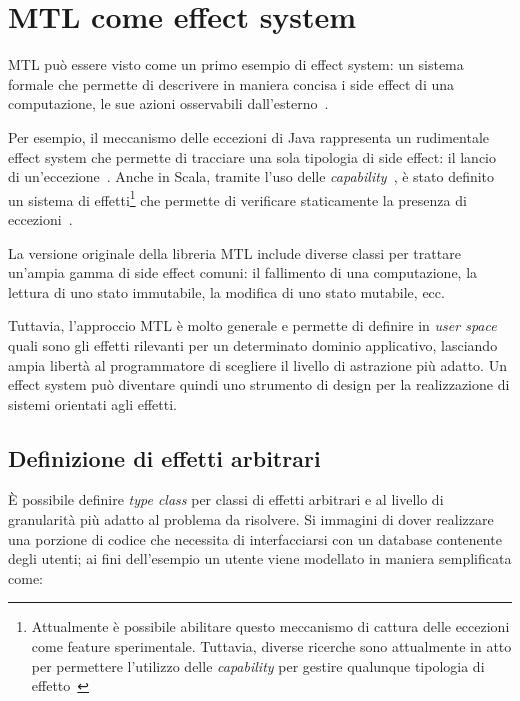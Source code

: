 \section{MTL come effect system}

MTL può essere visto come un primo esempio di effect system: un sistema formale che permette di descrivere in maniera concisa i side effect di una computazione, le sue azioni osservabili dall'esterno~\cite[p.~943]{cit:design-concepts-in-programming-languages}.

Per esempio, il meccanismo delle eccezioni di Java rappresenta un rudimentale effect system che permette di tracciare una sola tipologia di side effect: il lancio di un'eccezione~\cite[p.~985]{cit:design-concepts-in-programming-languages}.
Anche in Scala, tramite l'uso delle \emph{capability}~\cite{cit:scala-3-reference-canthrow}, è stato definito un sistema di effetti\footnote{Attualmente è possibile abilitare questo meccanismo di cattura delle eccezioni come feature sperimentale. Tuttavia, diverse ricerche sono attualmente in atto per permettere l'utilizzo delle \emph{capability} per gestire qualunque tipologia di effetto~\cite{cit:effects-capabilities-and-boxes-from-scope-based-reasoning-to-type-based-reasoning-and-back,cit:caprese}} che permette di verificare staticamente la presenza di eccezioni~\cite{cit:safer-exceptions-for-scala}.

La versione originale della libreria MTL include diverse classi per trattare un'ampia gamma di side effect comuni: il fallimento di una computazione, la lettura di uno stato immutabile, la modifica di uno stato mutabile, ecc.

Tuttavia, l'approccio MTL è molto generale e permette di definire in \emph{user space} quali sono gli effetti rilevanti per un determinato dominio applicativo, lasciando ampia libertà al programmatore di scegliere il livello di astrazione più adatto.
Un effect system può diventare quindi uno strumento di design per la realizzazione di sistemi orientati agli effetti.

\subsection{Definizione di effetti arbitrari}
È possibile definire \emph{type class} per classi di effetti arbitrari e al livello di granularità più adatto al problema da risolvere. Si immagini di dover realizzare una porzione di codice che necessita di interfacciarsi con un database contenente degli utenti; ai fini dell'esempio un utente viene modellato in maniera semplificata come:

